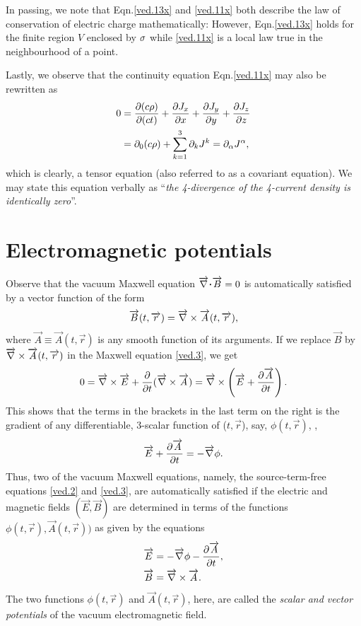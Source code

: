 In passing, we note that Eqn.\eqref{ved.13x} and 
\eqref{ved.11x} both describe the law of conservation of 
electric charge mathematically: However, 
Eqn.\eqref{ved.13x} holds for the finite region $V$ enclosed 
by ${\sigma}$ while \eqref{ved.11x}  is a local law true in the 
neighbourhood of a point. 

Lastly, we observe that the continuity  equation 
Eqn.\eqref{ved.11x} may also be rewritten as
\begin{align}\label{ved.14x}
0&=\frac{{\partial}(c\rho)}{{\partial} (ct)}+\frac{{\partial} J_x}{{\partial} x}
+\frac{{\partial} J_y}{{\partial} y}+\frac{{\partial} J_z}{{\partial} z}
\notag\\
&={\partial}_0 (c\rho) +\sum_{k=1}^3 {\partial}_k J^k= {\partial}_{{\alpha}} 
J^{{\alpha}} ,
\end{align}
which is clearly, a tensor  equation (also referred to 
as a covariant equation). 
We may state this equation verbally as ``\textsl{the 
4-divergence of the 4-current density is identically 
zero}''.

\vspace{-.2cm}

\section{Electromagnetic potentials}
Observe that the vacuum Maxwell equation $\vnab \dotp 
\vec{B}=0$ is automatically satisfied by a
vector function of the form
\begin{align*}
\overrightarrow{B}(t,\overrightarrow{r})= {\overrightarrow{\nabla} } \times \overrightarrow{A}(t,\overrightarrow{r}),
\end{align*}
where $\vec{A}\equiv \vec{A}(t,\vec{r}) $ is {any} smooth 
function of its arguments. If we replace $\vec{B}$ by ${\overrightarrow{\nabla} } 
\times \overrightarrow{A}(t,\overrightarrow{r})$ in the Maxwell equation 
\eqref{ved.3}, we get
\begin{align*}
0={\overrightarrow{\nabla} } \times \overrightarrow{E}+\frac{{\partial}}{{\partial} t} 
({\overrightarrow{\nabla} } \times\overrightarrow{A}) ={\overrightarrow{\nabla} } \times \left(\overrightarrow{E} + 
\frac{{\partial}\overrightarrow{A}}{{\partial} t} \right).
\end{align*}
This shows that the terms in the brackets in the last term 
on the right is the gradient of {any} differentiable, 
3-scalar function of ($t,\vec{r}$), say, $\phi(t,\vec{r})$, 
\ie,
 \begin{align*}
\overrightarrow{E}+ \frac{{\partial}{\overrightarrow{A}}}{{\partial}{t}}=-{\overrightarrow{\nabla} } \phi.
\end{align*}
Thus, two of the vacuum Maxwell equations, namely, the 
source-term-free equations  \eqref{ved.2} and \eqref{ved.3}, 
are automatically satisfied if the electric and magnetic 
fields $(\vec{E}, \vec{B})$ are determined in terms of the 
functions $\phi(t,\vec{r} ), \vec{A}( t,\vec{r}))$ as 
given by the  equations
\begin{align}\label{ved.15x}
&\overrightarrow{E}= -{\overrightarrow{\nabla} } \phi- \frac{{\partial}\overrightarrow{A}}{{\partial} t}, 
\\\label{ved.16x}
&\overrightarrow{B}= {\overrightarrow{\nabla} } \times \overrightarrow{A}.
\end{align}
The two functions $\phi (t,\vec{r})$ and 
$\vec{A}(t,\vec{r})$, here,  are called the \textsl{scalar 
and  vector potentials} of the vacuum electromagnetic field.

